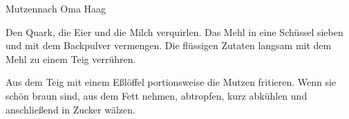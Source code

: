 \begin{recipe}{Mutzen}{nach Oma Haag}
  \label{Mutzen}
  \inglist

  \steps
  Den Quark, die Eier und die Milch verquirlen. Das Mehl in eine Schüssel sieben und mit
  dem Backpulver vermengen. Die flüssigen Zutaten langsam mit dem Mehl zu einem Teig
  verrühren.

  Aus dem Teig mit einem Eßlöffel portionsweise die Mutzen fritieren. Wenn sie schön braun
  sind, aus dem Fett nehmen, abtropfen, kurz abkühlen und anschließend in Zucker wälzen.
\end{recipe}
